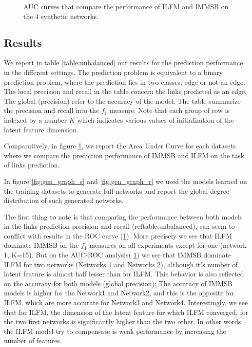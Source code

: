 \begin{figure}[h]
	\caption{AUC curves that compare the performance of ILFM and IMMSB on the 4 synthetic networks.}
	\label{fig:auc}
\end{figure}



\subsection{Results}

We report in table \ref{table:unbalanced} our results for the prediction performance in the different settings. The prediction problem is equivalent to a binary prediction problem, where the prediction lies in two classes; edge or not an edge. The local precision and recall in the table concern the links predicted as an edge. The global (precision) refer to the accuracy of the model. The table summarize the precision and recall into the $f_1$ measure. Note that each group of row is indexed by  a number $K$ which indicates various values of initialization of the latent feature dimension.

Comparatively, in figure \ref{fig:auc}, we report the Area Under Curve for each datasets where we compare the prediction performance of IMMSB and ILFM on the task of links prediction.

In figure \ref{fig:gen_graph_s} and \ref{fig:gen_graph_r} we used the models learned on the training datasets to generate full networks and report the global degree distribution of such generated networks. 

The first thing to note is that comparing the performance between both models in the links prediction precision and recall (ref{table:unbalanced}), can seem to conflict with results in the ROC curve (\ref{fig:auc}). More precisely we see that ILFM dominate IMMSB on the $f_1$ measures on all experiments except for one (network 1, K=15). But on the AUC-ROC analysis( \ref{fig:auc}) we see that IMMSB dominate ILFM for two networks (Networks 1 and Networks 2), although it's number of latent feature is almost half lesser than for ILFM. This behavior is also reflected on the accuracy for both models (global precision); The accuracy of IMMSB models is higher for the Network1 and Network2, and this is the opposite for ILFM, which are more accurate for Network3 and Network4. Interestingly, we see that for ILFM, the dimension of the latent feature for which ILFM converged, for the two first networks is significantly higher than the two other. In other words the ILFM model try to compensate is weak performance by increasing the number of features.

